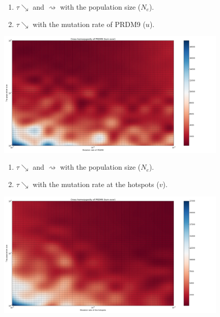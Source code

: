 \documentclass[10pt]{beamer}
\begin{document}
\begin{frame}
	\begin{center}
		\begin{enumerate}
		\item $\tau \searrow$ and $\rightsquigarrow$ with the population size ($N_e$).
			
		\item $\tau \searrow$ with the mutation rate of PRDM9 ($u$).
		\end{enumerate}
       \includegraphics[width=11cm]{Images/cross-homozygosity-population-mutation.png}
	\end{center}
\end{frame}

\begin{frame}
	\begin{center}
		\begin{enumerate}
		\item $\tau \searrow$ and $\rightsquigarrow$ with the population size ($N_e$).
			
		\item $\tau \searrow$ with the mutation rate at the hotspots ($v$).
		\end{enumerate}
       \includegraphics[width=11cm]{Images/cross-homozygosity-population-erosion.png}
	\end{center}
\end{frame}
\end{document}
